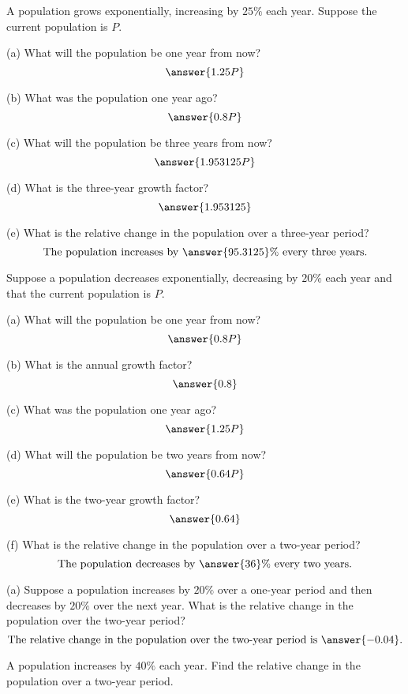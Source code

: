 \documentclass{ximera}
\begin{document}
\begin{question}  \label{Q00:ExponentialG}
A population grows exponentially, increasing by $25\%$ each year. Suppose the current population is $P$.

(a) What will the population be one year from now?
\[
\answer{1.25P}
\]
 
(b) What was the population one year ago?
\[
\answer{0.8P}
\]

(c) What will the population be three years from now?
\[
\answer{1.953125P}
\]

(d) What is the three-year growth factor?
\[
\answer{1.953125}
\]

(e) What is the relative change in the population over a three-year period?
\[
\text{The population increases by } \answer{95.3125}\% \text{ every three years.}
\]

\end{question}


\begin{question}  \label{Q1:ExponentialG}
Suppose a population decreases exponentially, decreasing by $20\%$ each year and that the current population is $P$. 

(a) What will the population be one year from now?  
\[
\answer{0.8P}
\]

(b) What is the annual growth factor?
\[
   \answer{0.8}
\]

(c) What was the population one year ago?
\[
\answer{1.25P}
\]

(d) What will the population be two years from now?
\[
\answer{0.64P}
\]

(e) What is the two-year growth factor?
\[
\answer{0.64}
\]

(f) What is the relative change in the population over a two-year period?
\[
\text{The population decreases by } \answer{36}\% \text{ every two years.}
\]

\end{question}

\begin{question}  \label{Q2:ExponentialG}
(a) Suppose a population increases by $20\%$ over a one-year period and then decreases by $20\%$ over the next year. What is the relative change in the population over the two-year period?
\[
   \text{The relative change in the population over the two-year period is }   \answer{-0.04} .
\]

\end{question}

\begin{question}  \label{Q3:ExponentialG}
A population increases by $40\%$ each year. Find the relative change in the population over a two-year period. 
\begin{multipleChoice}  
\end{multipleChoice}  
\end{question}
\end{document}
